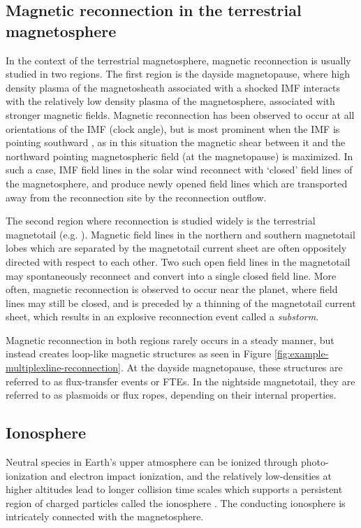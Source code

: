 \subsection{Magnetic reconnection in the terrestrial magnetosphere}
In the context of the terrestrial magnetosphere, magnetic reconnection is usually studied in two regions. The first region is the dayside magnetopause, where high density plasma of the magnetosheath associated with a shocked IMF interacts with the relatively low density plasma of the magnetosphere, associated with stronger magnetic fields. Magnetic reconnection has been observed to occur at all orientations of the IMF (clock angle), but is most prominent when the IMF is pointing southward \cite{Swisdak2003DiamagneticMagnetopause}, as in this situation the magnetic shear between it and the northward pointing magnetospheric field (at the magnetopause) is maximized. In such a case, IMF field lines in the solar wind reconnect with `closed' field lines of the magnetosphere, and produce newly opened field lines which are transported away from the reconnection site by the reconnection outflow.

The second region where reconnection is studied widely is the terrestrial magnetotail (e.g. ). Magnetic field lines in the northern and southern magnetotail lobes which are separated by the magnetotail current sheet are often oppositely directed with respect to each other. Two such open field lines in the magnetotail may spontaneously reconnect and convert into a single closed field line. More often, magnetic reconnection is observed to occur near the planet, where field lines may still be closed, and is preceded by a thinning of the magnetotail current sheet, which results in an explosive reconnection event called a \emph{substorm}. 

Magnetic reconnection in both regions rarely occurs in a steady manner, but instead creates loop-like magnetic structures as seen in Figure \ref{fig:example-multiplexline-reconnection}. At the dayside magnetopause, these structures are referred to as flux-transfer events or FTEs. In the nightside magnetotail, they are referred to as plasmoids or flux ropes, depending on their internal properties. 

\subsection{Ionosphere}
Neutral species in Earth's upper atmosphere can be ionized through photo-ionization and electron impact ionization, and the relatively low-densities at higher altitudes lead to longer collision time scales which supports a persistent region of charged particles called the ionosphere \cite{Schunk2009Ionospheres}. The conducting ionosphere is intricately connected with the magnetosphere.

